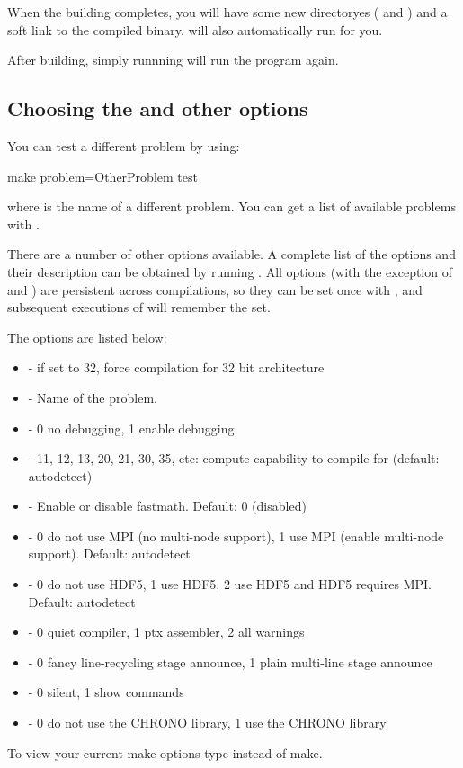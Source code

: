 When the building completes, you will have some new directoryes
( and ) and a  soft link to the
compiled binary.  will also automatically run
 for you.

After building, simply runnning  will run the program
again.


\subsection{Choosing the  and other options}\label{sec:compileoptions}

You can test a different problem by using:
\begin{shellcode}
make problem=OtherProblem test
\end{shellcode}
where  is the name of a different problem. You can get
a list of available problems with .

There are a number of other options available. A complete list of the
options and their description can be obtained by running . All options (with the exception of  and
) are persistent across compilations, so they can be set once
with , and subsequent executions of 
will remember the  set.

The  options are listed below:
\begin{itemize}
\item {} - if set to 32, force compilation for 32 bit architecture
\item {} - Name of the problem.
\item {} - 0 no debugging, 1 enable debugging
\item {} - 11, 12, 13, 20, 21, 30, 35, etc: compute capability to compile for (default: autodetect)
\item {} - Enable or disable fastmath. Default: 0 (disabled)
\item {} - 0 do not use MPI (no multi-node support), 1 use MPI (enable multi-node support). Default: autodetect
\item {} - 0 do not use HDF5, 1 use HDF5, 2 use HDF5 and HDF5 requires MPI. Default: autodetect
\item {} - 0 quiet compiler, 1 ptx assembler, 2 all warnings
\item {} - 0 fancy line-recycling stage announce, 1 plain multi-line stage announce
\item {} - 0 silent, 1 show commands
\item {} - 0 do not use the CHRONO library, 1 use the CHRONO library
\end{itemize}
To view your current make options type  instead of make.

